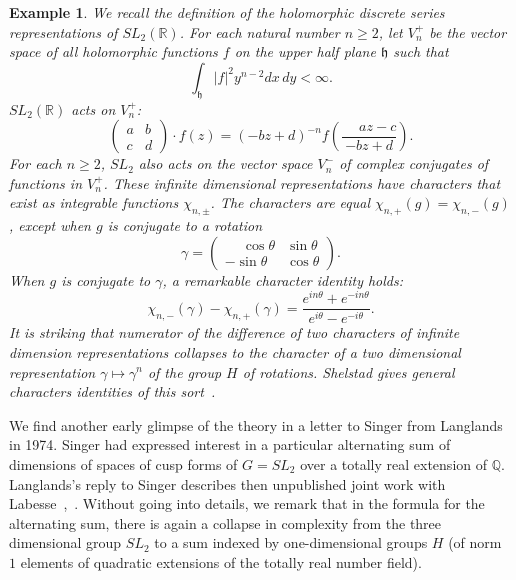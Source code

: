 \documentclass[brochure,english,12pt]{bourbaki}
\newtheorem{example}[equation]{Example}
\newcommand{\ring}[1]{\mathbb{#1}}
\begin{document}
\begin{example}\label{ex:sl2}  We recall the definition of the holomorphic discrete series representations
of $SL_2(\ring{R})$.  For each natural number $n\ge 2$, let $V^+_n$ be the vector space
of all holomorphic functions $f$ on the upper half plane ${\mathfrak h}$ such that
\[
\int_{\mathfrak h} |f|^2 y^{n-2} dx\, dy < \infty.
\]
$SL_2(\ring{R})$ acts on $V^+_n$:
\[
\begin{pmatrix} a & b \\ c & d \end{pmatrix} \cdot f(z) = 
(-b z + d ) ^{-n} f (\frac{\phantom{-}a z - c}{-b z + d}).
\]
For each $n\ge 2$, $SL_2$ also acts on the vector space $V^-_n$ of
complex conjugates of functions in $V^+_n$.  These infinite
dimensional representations have characters that exist as integrable
functions $\chi_{n,\pm}$.  The characters are equal
$\chi_{n,+}(g)=\chi_{n,-}(g)$, except when $g$ is conjugate to a
rotation
\[
\gamma = \begin{pmatrix} \phantom{-}\cos\theta & \sin\theta \\ -\sin\theta & \cos\theta\end{pmatrix}.
\] 
When $g$ is conjugate to $\gamma$, a remarkable character identity holds:
\[
\chi_{n,-}(\gamma) - \chi_{n,+}(\gamma) = 
\frac{e^{i n \theta} + e^{- i n \theta}}{e^{i\theta}-e^{-i\theta}}.
\]
It is striking that numerator of the difference of two characters of
infinite dimension representations collapses to the character of a two
dimensional representation $\gamma\mapsto \gamma^n$ of the group $H$ of
rotations.  Shelstad gives general characters identities of this
sort~\cite{Shelstad:OI}. %
\end{example}

We find another early glimpse of the theory in a letter to Singer from
Langlands in 1974.  Singer had expressed interest  in a
particular alternating sum of dimensions of spaces of cusp forms of
$G=SL_2$ over a totally real extension of $\ring{Q}$. 
Langlands's reply to Singer describes then unpublished
joint work with Labesse~\cite{L:singer:1974},~\cite{LL:1979}.  Without
going into details, we remark
that in the formula for the
  alternating sum, there is again a collapse in complexity from the
  three dimensional group $SL_2$ to a sum indexed by one-dimensional
  groups $H$ (of norm $1$ elements of quadratic extensions of the totally real number field).
\end{document}
